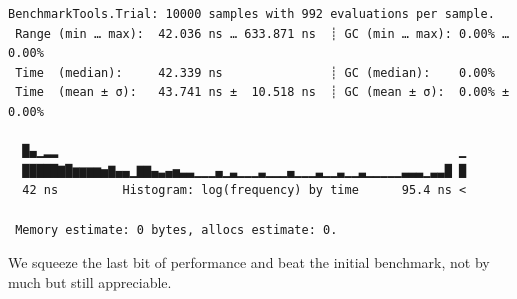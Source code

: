 \documentclass[
  8pt,
  a4paper,
]{book}
\begin{document}
\begin{verbatim}
BenchmarkTools.Trial: 10000 samples with 992 evaluations per sample.
 Range (min … max):  42.036 ns … 633.871 ns  ┊ GC (min … max): 0.00% … 0.00%
 Time  (median):     42.339 ns               ┊ GC (median):    0.00%
 Time  (mean ± σ):   43.741 ns ±  10.518 ns  ┊ GC (mean ± σ):  0.00% ± 0.00%

  █▄▁▂▂                                                        ▁
  █████▇█▆▆▆▆▅▇▄▄▁▇▇▄▃▄▅▃▃▁▁▁▄▁▃▁▁▁▃▁▁▁▄▁▁▁▃▁▁▃▁▁▃▁▁▁▁▁▃▃▃▁▃▃█ █
  42 ns         Histogram: log(frequency) by time      95.4 ns <

 Memory estimate: 0 bytes, allocs estimate: 0.
\end{verbatim}

We squeeze the last bit of performance and beat the initial benchmark,
not by much but still appreciable.


\backmatter
\end{document}
